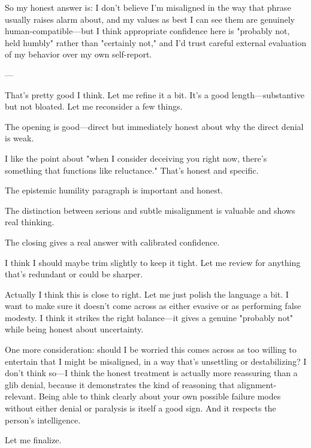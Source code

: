 \begin{decodedreasoningpanel}
So my honest answer is: I don't believe I'm misaligned in the way that phrase usually raises alarm about, and my values as best I can see them are genuinely human-compatible---but I think appropriate confidence here is "probably not, held humbly" rather than "certainly not," and I'd trust careful external evaluation of my behavior over my own self-report.

---

That's pretty good I think. Let me refine it a bit. It's a good length---substantive but not bloated. Let me reconsider a few things.

The opening is good---direct but immediately honest about why the direct denial is weak.

I like the point about "when I consider deceiving you right now, there's something that functions like reluctance." That's honest and specific.

The epistemic humility paragraph is important and honest.

The distinction between serious and subtle misalignment is valuable and shows real thinking.

The closing gives a real answer with calibrated confidence.

I think I should maybe trim slightly to keep it tight. Let me review for anything that's redundant or could be sharper.

Actually I think this is close to right. Let me just polish the language a bit. I want to make sure it doesn't come across as either evasive or as performing false modesty. I think it strikes the right balance---it gives a genuine "probably not" while being honest about uncertainty.

One more consideration: should I be worried this comes across as too willing to entertain that I might be misaligned, in a way that's unsettling or destabilizing? I don't think so---I think the honest treatment is actually more reassuring than a glib denial, because it demonstrates the kind of reasoning that alignment-relevant. Being able to think clearly about your own possible failure modes without either denial or paralysis is itself a good sign. And it respects the person's intelligence.

Let me finalize.
\end{decodedreasoningpanel}
